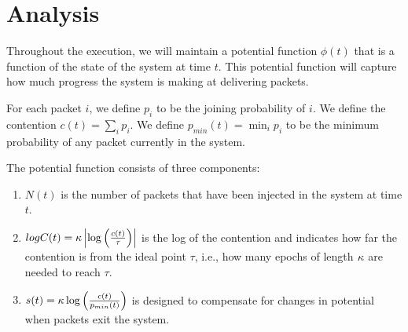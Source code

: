 \section{Analysis}

\newcommand{\pmin}{p_{min}}

Throughout the execution, we will maintain a potential function $\phi(t)$ that is a function of the state of the system at time $t$.  This potential function will capture how much progress the system is making at delivering packets.

For each packet $i$, we define $p_i$ to be the joining probability of $i$.  We define the contention $c(t) = \sum_i p_i$.  We define $\pmin(t) = \min_i p_i$ to be the minimum probability of any packet currently in the system.

The potential function consists of three components:
\begin{enumerate}
    \item $N(t)$ is the number of packets that have been injected in the system at time $t$.
    \item $logC(t) = \kappa\left|\log\left(\frac{c(t)}{\tau}\right)\right|$ is the log of the contention and indicates how far the contention is from the ideal point $\tau$, i.e., how many epochs of length $\kappa$ are needed to reach $\tau$. 
    \item $s(t) = \threshold\log\left(\frac{c(t)}{\pmin(t)}\right)$ is designed to compensate for changes in potential when packets exit the system.
\end{enumerate}

